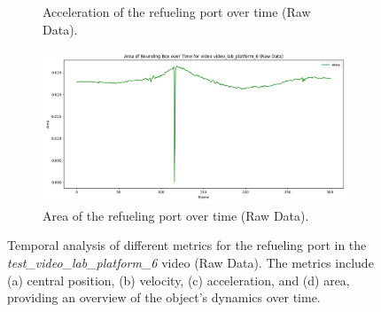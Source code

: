 \documentclass[12pt,oneside]{book} %
\begin{document}
\begin{figure}[H]
\begin{subfigure}[t]{0.45\textwidth}
        \caption{Acceleration of the refueling port over time (Raw Data).}
        \label{fig:acceleration-test-video_lab_platform_6}
    \end{subfigure}
    \hfill
    \begin{subfigure}[t]{0.45\textwidth}
        \includegraphics[width=\textwidth]{figures/bbox_metrics/video_lab_platform_6 (Raw Data)_area.png}
        \caption{Area of the refueling port over time (Raw Data).}
        \label{fig:size-test-video_lab_platform_6}
    \end{subfigure}
    \caption{Temporal analysis of different metrics for the refueling port in the \textit{test\_video\_lab\_platform\_6} video (Raw Data). The metrics include (a) central position, (b) velocity, (c) acceleration, and (d) area, providing an overview of the object's dynamics over time.}
    \label{fig:bbox-metrics-test-video_lab_platform_6}
\end{figure}
\end{document}
